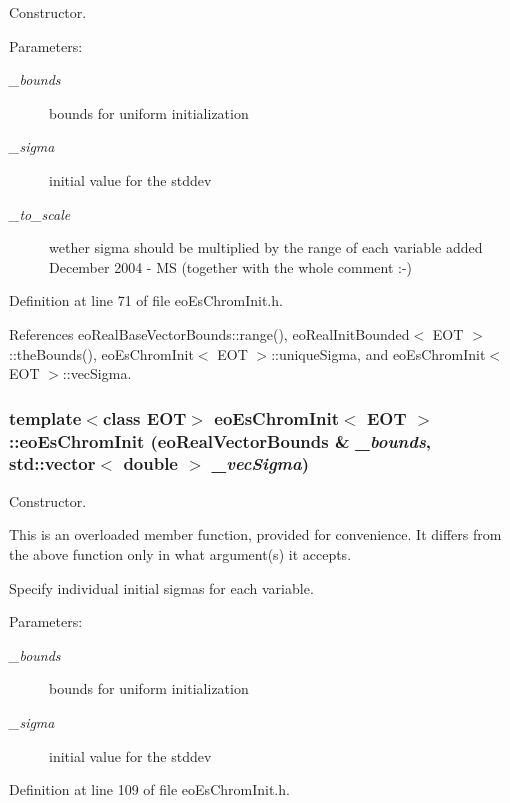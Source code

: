 Constructor. 

\begin{Desc}
\item[Parameters:]
\begin{description}
\item[{\em \_\-bounds}]bounds for uniform initialization \item[{\em \_\-sigma}]initial value for the stddev \item[{\em \_\-to\_\-scale}]wether sigma should be multiplied by the range of each variable added December 2004 - MS (together with the whole comment :-) \end{description}
\end{Desc}


Definition at line 71 of file eo\-Es\-Chrom\-Init.h.

References eo\-Real\-Base\-Vector\-Bounds::range(), eo\-Real\-Init\-Bounded$<$ EOT $>$::the\-Bounds(), eo\-Es\-Chrom\-Init$<$ EOT $>$::unique\-Sigma, and eo\-Es\-Chrom\-Init$<$ EOT $>$::vec\-Sigma.
\subsubsection{\setlength{\rightskip}{0pt plus 5cm}template$<$class EOT$>$ {\bf eo\-Es\-Chrom\-Init}$<$ {\bf EOT} $>$::{\bf eo\-Es\-Chrom\-Init} ({\bf eo\-Real\-Vector\-Bounds} \& {\em \_\-bounds}, std::vector$<$ double $>$ {\em \_\-vec\-Sigma})\hspace{0.3cm}{\tt  [inline]}}\label{classeo_es_chrom_init_a1}


Constructor. 

This is an overloaded member function, provided for convenience. It differs from the above function only in what argument(s) it accepts.

Specify individual initial sigmas for each variable.

\begin{Desc}
\item[Parameters:]
\begin{description}
\item[{\em \_\-bounds}]bounds for uniform initialization \item[{\em \_\-sigma}]initial value for the stddev \end{description}
\end{Desc}


Definition at line 109 of file eo\-Es\-Chrom\-Init.h.

